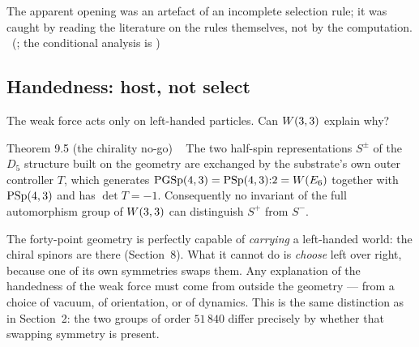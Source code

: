The apparent opening was an artefact of an
incomplete selection rule; it was caught by reading the literature on the rules themselves, not by
the computation. \tierC\ (;
the conditional analysis is )

\subsection{Handedness: host, not select}
\label{sec:chirality}

The weak force acts only on left-handed particles. Can $W(3,3)$ explain why?

\begin{result}{Theorem 9.5 (the chirality no-go) \hfill \tierT\ \tierC}
The two half-spin representations $S^\pm$ of the $D_5$ structure built on the
geometry are exchanged by the substrate's own outer controller $T$, which generates
$\mathrm{PGSp}(4,3)=\mathrm{PSp}(4,3){:}2=W(E_6)$ together with $\mathrm{PSp}(4,3)$ and has $\det T=-1$. Consequently
no invariant of the full automorphism group of $W(3,3)$ can distinguish $S^+$ from $S^-$.
\end{result}

\begin{plainwords}
The forty-point geometry is perfectly capable of \emph{carrying} a left-handed world: the
chiral spinors are there (Section~8). What it cannot do is \emph{choose} left over right,
because one of its own symmetries swaps them. Any explanation of the handedness of the weak
force must come from outside the geometry --- from a choice of vacuum, of orientation, or of
dynamics. This is the same distinction as in Section~2: the two groups of order $51\,840$
differ precisely by whether that swapping symmetry is present.
\end{plainwords}

